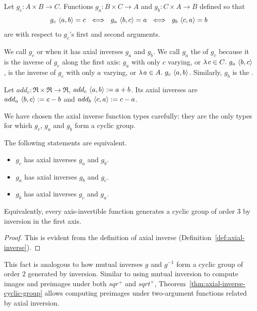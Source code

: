 \begin{definition}
\label{def:axial-inverse}
Let $g_c : A \times B \to C$.
Functions $g_a : B \times C \to A$ and $g_b : C \times A \to B$ defined so that
\begin{equation}
	g_c~\pair{a,b} = c\ \iff\ g_a~\pair{b,c} = a\ \iff\ g_b~\pair{c,a} = b
\end{equation}
are  with respect to $g_c$'s first and second arguments.
\end{definition}

We call $g_c$  or  when it has axial inverses $g_a$ and $g_b$.
We call $g_a$ the  of $g_c$ because it is the inverse of $g_c$ along the first axis: $g_a$ with only $c$ varying, or $\lambda\mspace{2mu}{c \in C}\ldotp\, g_a~\langle{b,c}\rangle$, is the inverse of $g_c$ with only $a$ varying, or $\lambda\mspace{2mu}{a \in A}\ldotp\, g_c~\langle{a,b}\rangle$.
Similarly, $g_b$ is the .

\begin{example}
\label{ex:plus-axial-inverses}
Let $add_c : \Re \times \Re \to \Re$, $add_c~\langle{a,b}\rangle := a+b$.
Its axial inverses are $add_a~\langle{b,c}\rangle := c - b$ and $add_b~\langle{c,a}\rangle := c - a$.
\exampleqed
\end{example}

We have chosen the axial inverse function types carefully: they are the only types for which $g_c$, $g_a$ and $g_b$ form a cyclic group.

\begin{theorem}
\label{thm:axial-inverse-cyclic-group}
The following statements are equivalent.
\begin{itemize}
	\item $g_c$ has axial inverses $g_a$ and $g_b$.
	\item $g_a$ has axial inverses $g_b$ and $g_c$.
	\item $g_b$ has axial inverses $g_c$ and $g_a$.
\end{itemize}
Equivalently, every axis-invertible function generates a cyclic group of order 3 by inversion in the first axis.
\end{theorem}
\begin{proof}
This is evident from the definition of axial inverse (Definition~\ref{def:axial-inverse}).
\end{proof}

This fact is analogous to how mutual inverses $g$ and $g^{-1}$ form a cyclic group of order 2 generated by inversion.
Similar to using mutual inversion to compute images and preimages under both $sqr^+$ and $sqrt^+$, Theorem~\ref{thm:axial-inverse-cyclic-group} allows computing preimages under two-argument functions related by axial inversion.

